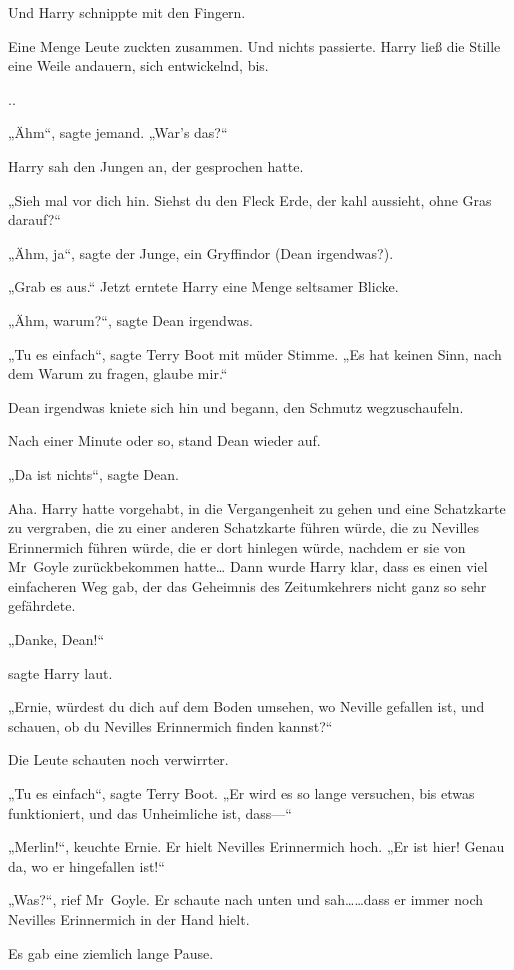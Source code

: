 {Und Harry schnippte mit den Fingern.

Eine Menge Leute zuckten zusammen. Und nichts passierte. Harry ließ die Stille eine Weile andauern, sich entwickelnd, bis.

..

„Ähm“, sagte jemand. „War's das?“

Harry sah den Jungen an, der gesprochen hatte.

„Sieh mal vor dich hin. Siehst du den Fleck Erde, der kahl aussieht, ohne Gras darauf?“

„Ähm, ja“, sagte der Junge, ein Gryffindor (Dean irgendwas?).

„Grab es aus.“ Jetzt erntete Harry eine Menge seltsamer Blicke.

„Ähm, warum?“, sagte Dean irgendwas.

„Tu es einfach“, sagte Terry Boot mit müder Stimme. „Es hat keinen Sinn, nach dem Warum zu fragen, glaube mir.“

Dean irgendwas kniete sich hin und begann, den Schmutz wegzuschaufeln.

Nach einer Minute oder so, stand Dean wieder auf.

„Da ist nichts“, sagte Dean.

Aha. Harry hatte vorgehabt, in die Vergangenheit zu gehen und eine Schatzkarte zu vergraben, die zu einer anderen Schatzkarte führen würde, die zu Nevilles Erinnermich führen würde, die er dort hinlegen würde, nachdem er sie von Mr~Goyle zurückbekommen hatte… Dann wurde Harry klar, dass es einen viel einfacheren Weg gab, der das Geheimnis des Zeitumkehrers nicht ganz so sehr gefährdete.

„Danke, Dean!“

sagte Harry laut.

„Ernie, würdest du dich auf dem Boden umsehen, wo Neville gefallen ist, und schauen, ob du Nevilles Erinnermich finden kannst?“

Die Leute schauten noch verwirrter.

„Tu es einfach“, sagte Terry Boot. „Er wird es so lange versuchen, bis etwas funktioniert, und das Unheimliche ist, dass—“

„Merlin!“, keuchte Ernie. Er hielt Nevilles Erinnermich hoch. „Er ist hier! Genau da, wo er hingefallen ist!“

„Was?“, rief Mr~Goyle. Er schaute nach unten und sah……dass er immer noch Nevilles Erinnermich in der Hand hielt.

Es gab eine ziemlich lange Pause.

}
